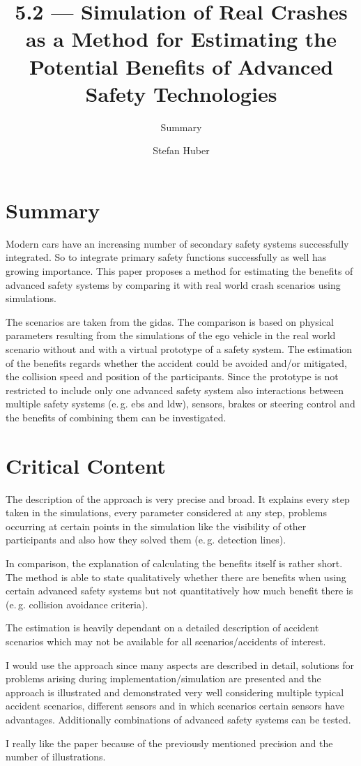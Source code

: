 \documentclass[oneside, notitlepage, twocolumn]{scrartcl}
\title{\LARGE 5.2 --- Simulation of Real Crashes as a Method for Estimating the Potential Benefits of Advanced Safety Technologies}
\subtitle{Summary}
\author{Stefan Huber}
\newcommand{\eg}{e.\,g.\xspace}
\begin{document}
\maketitle

\section{Summary}
Modern cars have an increasing number of secondary safety systems successfully integrated.
So to integrate primary safety functions successfully as well has growing importance.
This paper proposes a method for estimating the benefits of advanced safety systems by comparing it with real world crash scenarios using simulations.\par
The scenarios are taken from the \gls{gidas}.
The comparison is based on physical parameters resulting from the simulations of the ego vehicle in the real world scenario without and with a virtual prototype of a safety system.
The estimation of the benefits regards whether the accident could be avoided and/or mitigated, the collision speed and position of the participants.
Since the prototype is not restricted to include only one advanced safety system also interactions between multiple safety systems (\eg{} \gls{ebs} and \gls{ldw}), sensors, brakes or steering control and the benefits of combining them can be investigated.

\section{Critical Content}
The description of the approach is very precise and broad.
It explains every step taken in the simulations, every parameter considered at any step, problems occurring at certain points in the simulation like the visibility of other participants and also how they solved them (\eg{} detection lines).\par
In comparison, the explanation of calculating the benefits itself is rather short.
The method is able to state qualitatively whether there are benefits when using certain advanced safety systems but not quantitatively how much benefit there is (\eg{} collision avoidance criteria).\par
The estimation is heavily dependant on a detailed description of accident scenarios which may not be available for all scenarios/accidents of interest.\par
I would use the approach since many aspects are described in detail, solutions for problems arising during implementation/simulation are presented and the approach is illustrated and demonstrated very well considering multiple typical accident scenarios, different sensors and in which scenarios certain sensors have advantages.
Additionally combinations of advanced safety systems can be tested.\par
I really like the paper because of the previously mentioned precision and the number of illustrations.
\end{document}
